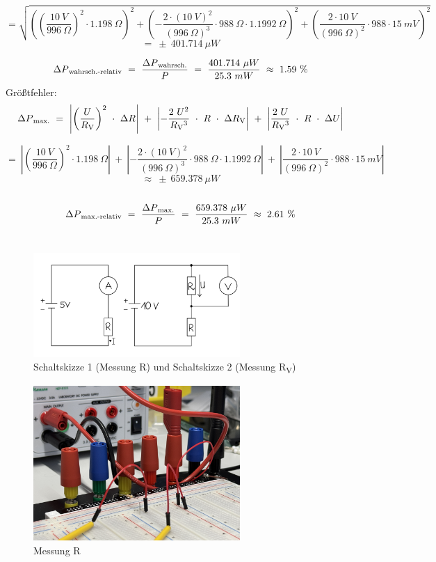 \documentclass[a4paper,12pt]{article}
\begin{document}
\[
=\sqrt{\left(\left(\frac{10~V}{996~\Omega}\right)^2\cdot1.198~\Omega\right)^2+\left(-\frac{2\cdot(10~V)^2}{(996~\Omega)^3}\cdot988~\Omega\cdot1.1992~\Omega \right)^2+\left(\frac{2\cdot10~V}{(996~\Omega)^2}\cdot988\cdot15~mV\right)^2}
\]
\[
=~\pm~401.714~\mu W
\]

\[
\Delta P\textsubscript{wahrsch.-relativ}~=~\frac{\Delta P\textsubscript{wahrsch.}}{P}~=~\frac{401.714~\mu W}{25.3~mW}~\approx~1.59~\%
\]
Größtfehler:\\
\[
\Delta P\textsubscript{max.}~=~\left\lvert \left(\frac{U}{R\textsubscript{V}}\right)^2~\cdot~\Delta R\right\rvert~+~\left\lvert -\frac{2~U^2}{R\textsubscript{V}^3}~\cdot~R~\cdot~\Delta R\textsubscript{V}\right\rvert~+~\left\lvert \frac{2~U}{R\textsubscript{V}^3}~\cdot~R~\cdot~\Delta U\right\rvert
\]


\[
=~\left\lvert \left(\frac{10~V}{996~\Omega}\right)^2\cdot1.198~\Omega\right\rvert~+~\left\lvert -\frac{2\cdot(10~V)^2}{(996~\Omega)^3}\cdot988~\Omega\cdot1.1992~\Omega\right\rvert~+~\left\lvert\frac{2\cdot10~V}{(996~\Omega)^2}\cdot988\cdot15~mV\right\rvert
\]
\[
\approx~\pm~659.378~\mu W
\]\\
\[
\Delta P\textsubscript{max.-relativ}~=~\frac{\Delta P\textsubscript{max.}}{P}~=~\frac{659.378~\mu W}{25.3~mW}~\approx~2.61~\%
\]\\


\begin{figure}[H]
    \centering
    \includegraphics[width=0.7\textwidth]{../Quellen/Labor2/Schaltskizzen Widerstandsmessung.jpeg}
\caption{Schaltskizze 1 (Messung R) und Schaltskizze 2 (Messung R\textsubscript{V})}
\end{figure}



\begin{figure}[H]
    \centering
    \includegraphics[width=0.7\textwidth]{../Quellen/Labor2/Fotos/IMG_3979.jpeg}
\caption{Messung R}
\end{figure}
\end{document}
